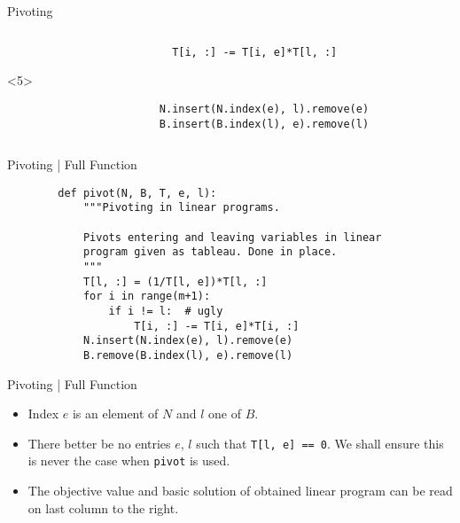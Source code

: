 \documentclass[aspectratio = 169]{beamer}
\begin{document}
\begin{frame}[fragile]{Pivoting}
\begin{columns}
\begin{column}{.5\textwidth}
\begin{overlayarea}{.96\textwidth}{.45\textheight}
\begin{onlyenv}
\begin{tcolorbox}
{\begin{verbatim}
                          T[i, :] -= T[i, e]*T[l, :]
                      \end{verbatim}
                    }
                \end{tcolorbox}
            \end{onlyenv}
            \begin{onlyenv}<5>
                \begin{tcolorbox}[
                    enhanced,
                    parbox = false,
                    colback = mLightBrown!10!white,
                    colframe = mLightBrown,
                    arc = 0mm,
                    ]
                    \small{
                      \begin{verbatim}
                        N.insert(N.index(e), l).remove(e)
                        B.insert(B.index(l), e).remove(l)
                      \end{verbatim}
                    }
            \end{tcolorbox}
            \end{onlyenv}
        \end{overlayarea}
        \end{column}
    \end{columns}
\end{frame}

\begin{frame}[fragile]{Pivoting | Full Function}
     \small{
      \begin{verbatim}
        def pivot(N, B, T, e, l):
            """Pivoting in linear programs.

            Pivots entering and leaving variables in linear
            program given as tableau. Done in place.
            """
            T[l, :] = (1/T[l, e])*T[l, :]
            for i in range(m+1):
                if i != l:  # ugly
                    T[i, :] -= T[i, e]*T[i, :]
            N.insert(N.index(e), l).remove(e)
            B.remove(B.index(l), e).remove(l)
      \end{verbatim}
    }
\end{frame}

\begin{frame}{Pivoting | Full Function}
  \begin{itemize}
  \item<1->
    Index $e$ is an element of $N$ and $l$ one of $B$.
  \item<2->
    There better be no entries $e$, $l$ such that
    \texttt{T[l, e] == 0}. We shall ensure this is never
    the case when \texttt{pivot} is used.
  \item<3->
    The objective value and basic solution of obtained linear program
    can be read on last column to the right.
  \end{itemize}
\end{frame}
\end{document}
